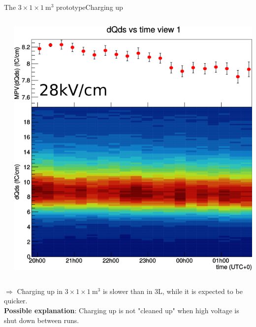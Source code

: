 \documentclass[10pt]{beamer}
\begin{document}
\begin{frame}{The \texorpdfstring{$3 \times 1 \times \SI{1}{\meter\cubed}$}{311} prototype}{Charging up}
\begin{scriptsize}
\begin{columns}
\begin{column}{0.45\textwidth}
\begin{itemize}
    				\end{itemize}
    			\end{column}\hfill
    			\begin{column}{0.55\textwidth}
    				\centering \includegraphics[width=\textwidth]{figures/311/311_charging_up.png}\\
    				\vfill
    			\end{column}
    		\end{columns}
    		$\Rightarrow$ Charging up in $3 \times 1 \times \SI{1}{\meter\cubed}$ is slower than in 3L, while it is expected to be quicker.\\    		
    		\textbf{Possible explanation}: Charging up is not "cleaned up" when high voltage is shut down between runs.
    	\end{scriptsize}
    \end{frame}
    
\end{document}
